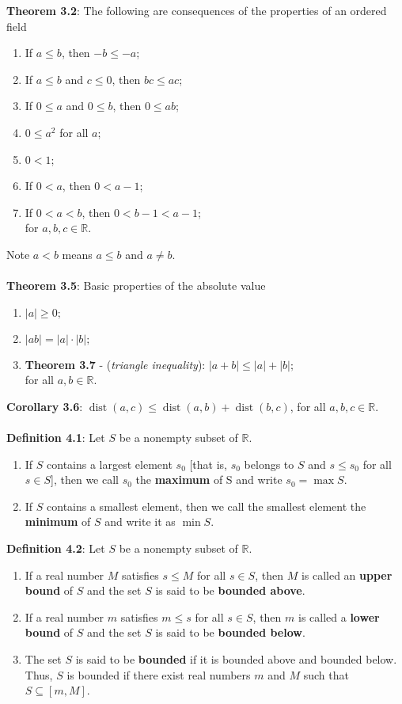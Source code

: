 \documentclass{article}
\theoremstyle{definition}
\DeclareMathOperator{\Dist}{dist}
\begin{document}
\textbf{Theorem 3.2}: The following are consequences of the properties of an ordered field \begin{enumerate}
    \item If $a \leq b$, then $-b \leq -a$;
    \item If $a \leq b$ and $c \leq 0$, then $bc \leq ac$;
    \item If $0 \leq a$ and $0 \leq b$, then $0 \leq ab$;
    \item $0 \leq a^2$ for all $a$;
    \item $0 < 1$;
    \item If $0 < a$, then $0 < a - 1$;
    \item If $0 < a < b$, then $0 < b - 1 < a - 1$; \\
    for $a, b, c \in \mathbb{R}$.
\end{enumerate} $ $ \\
Note $a < b$ means $a \leq b$ and $a \neq b$. \\ \\
\textbf{Theorem 3.5}: Basic properties of the absolute value \begin{enumerate}
    \item $|a| \geq 0;$
    \item $|ab| = |a| \cdot |b|;$
    \item \textbf{Theorem 3.7} - (\textit{triangle inequality}): $|a + b| \leq |a| + |b|;$ \\
    for all $a, b \in \mathbb{R}$.
\end{enumerate} $ $ \\
\textbf{Corollary 3.6}: $\Dist(a, c) \leq \Dist(a, b) + \Dist(b, c)$, for all $a, b, c \in \mathbb{R}$. \\ \\
\textbf{Definition 4.1}: Let $S$ be a nonempty subset of $\mathbb{R}$. \begin{enumerate}
    \item If $S$ contains a largest element $s_0$ [that is, $s_0$ belongs to $S$ and $s \leq s_0$ for all $s \in S$], then we call $s_0$ the \textbf{maximum} of S and write $s_0 = \max{S}$.
    \item If $S$ contains a smallest element, then we call the smallest element the \textbf{minimum} of $S$ and write it as $\min{S}$.
\end{enumerate}
\textbf{Definition 4.2}: Let $S$ be a nonempty subset of $\mathbb{R}$. \begin{enumerate}
    \item If a real number $M$ satisfies $s \leq M$ for all $s \in S$, then $M$ is called an \textbf{upper bound} of $S$ and the set $S$ is said to be \textbf{bounded above}.
    \item If a real number $m$ satisfies $m \leq s$ for all $s \in S$, then $m$ is called a \textbf{lower bound} of $S$ and the set $S$ is said to be \textbf{bounded below}.
    \item The set $S$ is said to be \textbf{bounded} if it is bounded above and bounded below. Thus, $S$ is bounded if there exist real numbers $m$ and $M$ such that $S \subseteq [m,M]$.
\end{enumerate} $ $ \\
\end{document}
